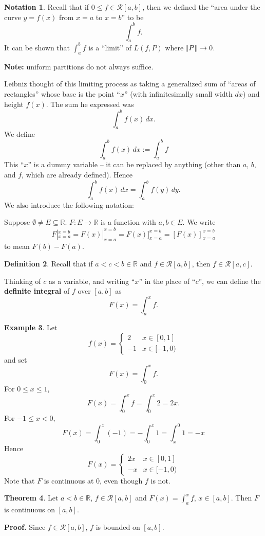 \documentclass[11pt]{article}
\theoremstyle{definition}
\newtheorem{thm}{Theorem}[section]
\newtheorem{defn}[thm]{Definition}
\newtheorem{exmp}[thm]{Example}
\newtheorem{notation}[thm]{Notation}
\newcommand{\mbR}{\ensuremath{\mathbb{R}}}
\begin{document}
\begin{notation}
Recall that if $0 \leq f \in \mathcal{R}[a, b]$, then we defined the ``area under the curve $y = f(x)$ from $x = a$ to $x = b$'' to be
$$\int_a^b f \text{.}$$
It can be shown that $\int_a^b f$ is a ``limit'' of $L(f, P)$ where $\norm{P} \to 0$. 

\textbf{Note:} uniform partitions do not always suffice. 

Leibniz thought of this limiting process as taking a generalized sum of ``areas of rectangles'' whose base is the point ``$x$'' (with infinitesimally small width $dx$) and height $f(x)$. The sum he expressed was
$$\int_a^b f(x)\,dx \text{.}$$
We define
$$\int_a^b f(x)\,dx := \int_a^b f$$
This ``$x$'' is a dummy variable -- it can be replaced by anything (other than $a$, $b$, and $f$, which are already defined). Hence
$$\int_a^b f(x)\,dx = \int_a^b f(y)\,dy \text{.}$$
We also introduce the following notation: 

Suppose $\emptyset \ne E \subseteq \mbR$. $F : E \to \mbR$ is a function with $a, b \in E$. We write
$$F|_{x=a}^{x=b} = F(x)|_{x=a}^{x=b} = F(x)\big]_{x=a}^{x=b} = \left[F(x)\right]_{x=a}^{x=b}$$
to mean $F(b) - F(a)$. 
\end{notation}

\begin{defn}
Recall that if $a < c < b \in \mbR$ and $f \in \mathcal{R}[a, b]$, then $f \in \mathcal{R}[a, c]$. 

Thinking of $c$ as a variable, and writing ``$x$'' in the place of ``$c$'', we can define the \textbf{definite integral} of $f$ over  $[a, b]$ as
$$F(x) = \int_a^x f \text{.}$$
\end{defn}

\begin{exmp}
Let
$$f(x) = \begin{cases} 2 & x \in [0, 1] \\ -1 & x \in [-1, 0) \end{cases}$$
and set $$F(x) = \int_0^x f \text{.}$$
For $0 \leq x \leq 1$, 
$$F(x) = \int_0^x f = \int_0^x 2 = 2x \text{.}$$
For $-1 \leq x < 0$, 
$$F(x) = \int_0^x (-1) = -\int_0^x 1 = \int_x^0 1 = -x$$
Hence
$$F(x) = \begin{cases} 2x & x \in [0, 1] \\ -x & x \in [-1, 0) \end{cases}$$
Note that $F$ is continuous at 0, even though $f$ is not.
\end{exmp}

\begin{thm}
Let $a<b\in\mbR$, $f \in \mathcal{R}[a, b]$ and $F(x) = \int_a^x f$, $x \in [a, b]$. Then $F$ is continuous on $[a, b]$.
\end{thm}
\textbf{Proof.} Since $f \in \mathcal{R}[a, b]$, $f$ is bounded on $[a, b]$. 
\end{document}
